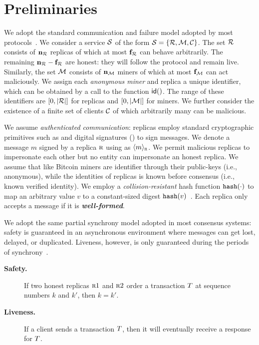 \section{Preliminaries}
We adopt the standard communication and failure model adopted by most \BFT{} 
protocols~\cite{poe,pbftj,geobft}. We consider a service $\mathcal{S}$ of the 
form $\mathcal{S} = \{\mathcal{R}{}, \mathcal{M}{}, \mathcal{C}{} \}$. The set $\mathcal{R}$ 
consists of $\mathbf{n}_{\mathcal{R}{}}$ replicas of which at most $\mathbf{f}_{\mathcal{R}{}}$ can 
behave arbitrarily. The remaining $\mathbf{n}_{\mathcal{R}}-\mathbf{f}_{\mathcal{R}}$ are honest: 
they will follow the protocol and remain live. Similarly, the set $\mathcal{M}$ 
consists of $\mathbf{n}_{\mathcal{M}{}}$ miners of which at most $\mathbf{f}_{\mathcal{M}{}}$ can act 
maliciously. We assign each {\em anonymous miner} and replica a unique identifier, 
which can be obtained by a call to the function $\mathop{\textsf{id}}()$. The range of these 
identifiers are $[0, \lvert \mathcal{R} \rvert]$ for replicas and $[0, \lvert \mathcal{M} \rvert]$ 
for miners. We further consider the existence of a finite set of clients 
$\mathcal{C}$ of which arbitrarily many can be malicious.

We assume {\em authenticated communication}: replicas employ standard 
cryptographic primitives such as \MAC{} and digital signatures (\DS{}) to 
sign messages. We denote a message $m$ signed by a replica $\textsc{r}{}$ using 
\DS{} as {\bf $\langle m\rangle_{\textsc{r}{}}$}. We permit malicious replicas to 
impersonate each other but no entity can impersonate an honest replica. We assume 
that like Bitcoin miners are identifier through their public-keys (i.e., anonymous), 
while the identities of replicas is known before consensus (i.e., known verified 
identity). We employ a \emph{collision-resistant} hash function $\texttt{hash}(\cdot)$ 
to map an arbitrary value $v$ to a constant-sized digest 
$\texttt{hash}(v)$~\cite{cryptobook}. Each replica only accepts a message if it is 
{\bf \em well-formed}.

We adopt the same partial synchrony model adopted in most consensus systems: 
safety is guaranteed in an asynchronous environment where messages can get 
lost, delayed, or duplicated. Liveness, however, is only guaranteed during the 
periods of synchrony~\cite{pbftj,poe,rcc,geobft,hotstuff}.
%
\begin{description}
\item[\bf Safety.] 
If two honest replicas $\textsc{r}{1}$ and $\textsc{r}{2}$ order a transaction 
$\Transaction{}$ at sequence numbers $k$ and $k'$, then $k = k'$.

\item[\bf Liveness.]
If a client sends a transaction $\Transaction{}$, then it will eventually 
receive a response for $\Transaction{}$.
\end{description}

